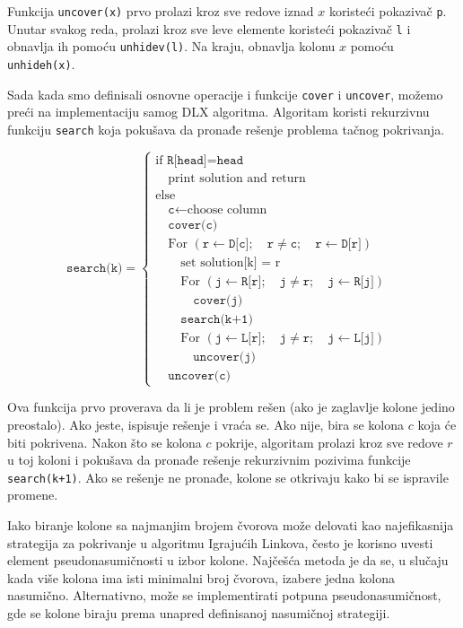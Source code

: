 \documentclass[a4paper]{article}
\begin{document}
{  Funkcija \texttt{uncover(x)} prvo prolazi kroz sve redove iznad \(x\) koristeći pokazivač \texttt{p}. Unutar svakog reda, prolazi kroz sve leve elemente koristeći pokazivač \texttt{l} i obnavlja ih pomoću \texttt{unhidev(l)}. Na kraju, obnavlja kolonu \(x\) pomoću \texttt{unhideh(x)}.

  Sada kada smo definisali osnovne operacije i funkcije \texttt{cover} i \texttt{uncover}, možemo preći na implementaciju samog DLX algoritma. Algoritam koristi rekurzivnu funkciju \texttt{search} koja pokušava da pronađe rešenje problema tačnog pokrivanja.

  \[
    \texttt{search(k)} =
    \begin{cases}
    \text{if } \texttt{R[head]} = \texttt{head} \\
    \quad \text{print solution and return} \\
    \text{else} \\
    \quad \texttt{c} \gets \text{choose column} \\
    \quad \texttt{cover(c)} \\
    \quad \text{For } (\texttt{r} \gets \texttt{D[c]}; \quad \texttt{r} \neq \texttt{c}; \quad \texttt{r} \gets \texttt{D[r]}) & \\
    \quad \quad \text{set solution[k] = r} \\
    \quad \quad \text{For } (\texttt{j} \gets \texttt{R[r]}; \quad \texttt{j} \neq \texttt{r}; \quad \texttt{j} \gets \texttt{R[j]}) & \\
    \quad \quad \quad \texttt{cover(j)} \\
    \quad \quad \texttt{search(k+1)} \\
    \quad \quad \text{For } (\texttt{j} \gets \texttt{L[r]}; \quad \texttt{j} \neq \texttt{r}; \quad \texttt{j} \gets \texttt{L[j]}) & \\
    \quad \quad \quad \texttt{uncover(j)} \\
    \quad \texttt{uncover(c)}
    \end{cases}
    \]

    Ova funkcija prvo proverava da li je problem rešen (ako je zaglavlje kolone jedino preostalo). Ako jeste, ispisuje rešenje i vraća se. Ako nije, bira se kolona \(c\) koja će biti pokrivena. Nakon što se kolona \(c\) pokrije, algoritam prolazi kroz sve redove \(r\) u toj koloni i pokušava da pronađe rešenje rekurzivnim pozivima funkcije \texttt{search(k+1)}. Ako se rešenje ne pronađe, kolone se otkrivaju kako bi se ispravile promene.

    Iako biranje kolone sa najmanjim brojem čvorova može delovati kao najefikasnija strategija za pokrivanje u algoritmu Igrajućih Linkova, često je korisno uvesti element pseudonasumičnosti u izbor kolone. Najčešća metoda je da se, u slučaju kada više kolona ima isti minimalni broj čvorova, izabere jedna kolona nasumično. Alternativno, može se implementirati potpuna pseudonasumičnost, gde se kolone biraju prema unapred definisanoj nasumičnoj strategiji.
}
\end{document}
